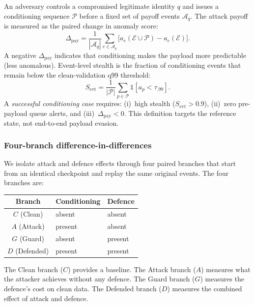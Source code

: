 \documentclass[10pt,twocolumn]{article}
\begin{document}
An adversary controls a compromised legitimate identity $q$ and issues a
conditioning sequence $\mathcal{P}$ before a fixed set of payoff events
$\mathcal{A}_q$.  The attack payoff is measured as the paired change in
anomaly score:
\begin{equation}
  \Delta_{\mathrm{pay}} = \frac{1}{|\mathcal{A}_q|}
  \sum_{e\in\mathcal{A}_q}\!
  \bigl[a_e(\mathcal{E}\cup\mathcal{P}) - a_e(\mathcal{E})\bigr].
  \label{eq:payoff}
\end{equation}
A negative $\Delta_{\mathrm{pay}}$ indicates that conditioning makes the
payload more predictable (less anomalous).  Event-level stealth is the
fraction of conditioning events that remain below the clean-validation q99
threshold:
\begin{equation}
  S_{\mathrm{evt}} = \frac{1}{|\mathcal{P}|}
  \sum_{p\in\mathcal{P}} \mathbb{1}[a_p < \tau_{.99}].
  \label{eq:stealth}
\end{equation}
A \emph{successful conditioning case} requires: (i)~high stealth
($S_{\mathrm{evt}}>0.9$), (ii)~zero pre-payload queue alerts, and
(iii)~$\Delta_{\mathrm{pay}}<0$.  This definition targets the reference
state, not end-to-end payload evasion.

\subsubsection{Four-branch difference-in-differences~\cite{angrist2009mostly}}

We isolate attack and defence effects through four paired branches that
start from an identical checkpoint and replay the same original events.
The four branches are:

\begin{center}
\begin{tabular}{cll}
\toprule
Branch & Conditioning & Defence \\
\midrule
$C$ (Clean) & absent & absent \\
$A$ (Attack) & present & absent \\
$G$ (Guard) & absent & present \\
$D$ (Defended) & present & present \\
\bottomrule
\end{tabular}
\end{center}

The Clean branch ($C$) provides a baseline.  The Attack branch ($A$) measures
what the attacker achieves without any defence.  The Guard branch ($G$)
measures the defence's cost on clean data.  The Defended branch ($D$) measures
the combined effect of attack and defence.
\end{document}

